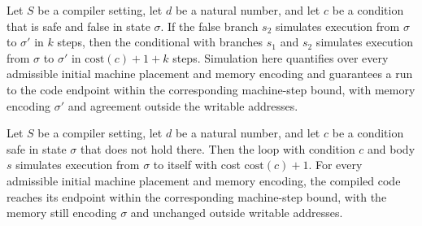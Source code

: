 \begin{theorem}
\label{Light.Compiler.sim_iteFalse}
\leanok
{}
Let $S$ be a compiler setting, let $d$ be a natural number, and let $c$ be a condition
that is safe and false in state $\sigma$. If the false branch $s_2$ simulates execution
from $\sigma$ to $\sigma'$ in $k$ steps, then the conditional with branches $s_1$ and
$s_2$ simulates execution from $\sigma$ to $\sigma'$ in $\mathrm{cost}(c)+1+k$ steps.
Simulation here quantifies over every admissible initial machine placement and memory
encoding and guarantees a run to the code endpoint within the corresponding machine-step
bound, with memory encoding $\sigma'$ and agreement outside the writable addresses.
\end{theorem}

\begin{theorem}
\label{Light.Compiler.sim_whileFalse}
\leanok
{}
Let $S$ be a compiler setting, let $d$ be a natural number, and let $c$ be a condition
safe in state $\sigma$ that does not hold there. Then the loop with condition $c$ and
body $s$ simulates execution from $\sigma$ to itself with cost $\mathrm{cost}(c)+1$. For
every admissible initial machine placement and memory encoding, the compiled code
reaches its endpoint within the corresponding machine-step bound, with the memory still
encoding $\sigma$ and unchanged outside writable addresses.
\end{theorem}

